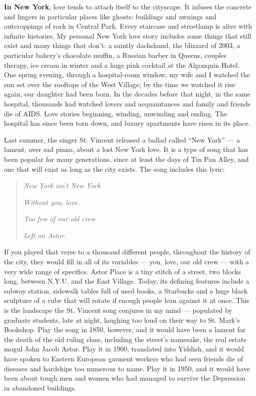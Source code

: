\textbf{In New York}, love tends to attach itself to the cityscape. It
infuses the concrete and lingers in particular places like ghosts:
buildings and awnings and outcroppings of rock in Central Park. Every
staircase and streetlamp is alive with infinite histories. My personal
New York love story includes some things that still exist and many
things that don't: a saintly dachshund, the blizzard of 2003, a
particular bakery's chocolate muffin, a Russian barber in Queens,
couples therapy, ice cream in winter and a huge pink cocktail at the
Algonquin Hotel. One spring evening, through a hospital-room window, my
wife and I watched the sun set over the rooftops of the West Village; by
the time we watched it rise again, our daughter had been born. In the
decades before that night, in the same hospital, thousands had watched
lovers and acquaintances and family and friends die of AIDS. Love
stories beginning, winding, unwinding and ending. The hospital has since
been torn down, and luxury apartments have risen in its place.

Last summer, the singer St. Vincent released a ballad called ``New
York'' --- a lament, over sad piano, about a lost New York love. It is a
type of song that has been popular for many generations, since at least
the days of Tin Pan Alley, and one that will exist as long as the city
exists. The song includes this lyric:

\begin{quote}
\emph{New York isn't New York}

\emph{Without you, love.}

\emph{Too few of our old crew}

\emph{Left on Astor.}
\end{quote}

If you played that verse to a thousand different people, throughout the
history of the city, they would fill in all of its variables --- you,
love, our old crew --- with a very wide range of specifics. Astor Place
is a tiny stitch of a street, two blocks long, between N.Y.U. and the
East Village. Today, its defining features include a subway station,
sidewalk tables full of used books, a Starbucks and a huge black
sculpture of a cube that will rotate if enough people lean against it at
once. This is the landscape the St. Vincent song conjures in my mind ---
populated by graduate students, late at night, laughing too loud on
their way to St. Mark's Bookshop. Play the song in 1850, however, and it
would have been a lament for the death of the old ruling class,
including the street's namesake, the real estate mogul John Jacob Astor.
Play it in 1900, translated into Yiddish, and it would have spoken to
Eastern European garment workers who had seen friends die of diseases
and hardships too numerous to name. Play it in 1950, and it would have
been about tough men and women who had managed to survive the Depression
in abandoned buildings.

